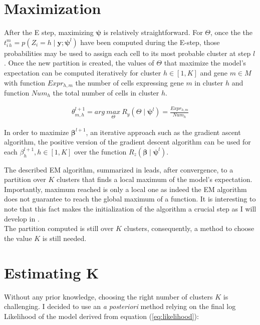 \section{Maximization}
After the E step, maximizing $\boldsymbol{\psi}$ is relatively straightforward. For $\Theta$, once the the $t_{i\,h}^{m} = p(Z_i = h \mid \boldsymbol{y};\boldsymbol{\psi}^{l})$ have been computed during the E-step, those probabilities may be used to assign each cell to its most probable cluster at step $l$. Once the new partition is created, the values of $\Theta$ that maximize the model's expectation can be computed iteratively for cluster $h \in [1,K]$ and gene $m \in M$ with function $Expr_{h,m}$ the number of cells expressing gene $m$ in cluster $h$ and function $Num_h$ the total number of cells in cluster $h$.

\begin{align*}
\theta_{m,h}^{l+1} = arg\:\underset{\Theta}{max}\:R_y(\Theta\mid \boldsymbol{\psi}^l) = \frac{Expr_{h,m}}{Num_h}
\end{align*}

In order to maximize $\boldsymbol{\beta}^{l+1}$, an iterative approach such as the gradient ascent algorithm, the positive version of the gradient descent algorithm \cite{burges2005} can be used for each $\beta_h^{l+1}, h \in [1,K]$ over the function $R_z(\boldsymbol{\beta}\mid \boldsymbol{\psi}^l)$. \\


The described EM algorithm, summarized in  leads, after convergence, to a partition over $K$ clusters that finds a local maximum of the model's expectation. Importantly, maximum reached is only a local one as indeed the EM algorithm does not guarantee to reach the global maximum of a function. It is interesting to note that this fact makes the initialization of the algorithm a crucial step as I will develop in .\\

The partition computed is still over $K$ clusters, consequently, a method to choose the value $K$ is still needed.

\section{Estimating K}
Without any prior knowledge, choosing the right number of clusters $K$ is challenging. I decided to use an {\it{a posteriori}} method relying on the final log Likelihood of the model derived from equation (\ref{eq:likelihood}):


